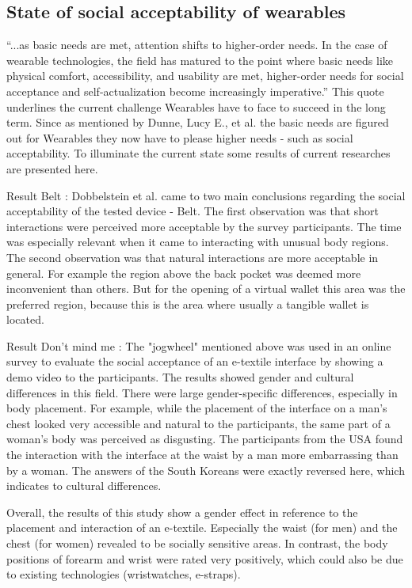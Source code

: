 \documentclass{sigchi}
\begin{document}
\subsection{State of social acceptability of wearables}
“...as basic needs are met, attention shifts to higher-order needs. In the case of wearable technologies, the field has matured to the point where basic needs like physical comfort, accessibility, and usability are met, higher-order needs for social acceptance and self-actualization become increasingly imperative.” \cite[p. 4162]{social-comfort} %
This quote underlines the current challenge Wearables have to face to succeed in the long term. Since as mentioned by Dunne, Lucy E., et al. the basic needs are figured out for Wearables they now have to please higher needs - such as social acceptability. To illuminate the current state some results of current researches are presented here.



Result Belt \cite{belt} : Dobbelstein et al. came to two main conclusions regarding the social acceptability of the tested device - Belt. The first observation was that short interactions were perceived more acceptable by the survey participants. The time was especially relevant when it came to interacting with unusual body regions. The second observation was that natural interactions are more acceptable in general. For example the region above the back pocket was deemed more inconvenient than others. But for the opening of a virtual wallet this area was the preferred region, because this is the area where usually a tangible wallet is located.

Result Don’t mind me \cite{touch-wrist}: The "jogwheel" mentioned above was used in an online survey to evaluate the social acceptance of an e-textile interface by showing a demo video to the participants. The results showed gender and cultural differences in this field. There were large gender-specific differences, especially in body placement. For example, while the placement of the interface on a man's chest looked very accessible and natural to the participants, the same part of a woman's body was perceived as disgusting. The participants from the USA found the interaction with the interface at the waist by a man more embarrassing than by a woman. The answers of the South Koreans were exactly reversed here, which indicates to cultural differences. \cite{touch-wrist}

Overall, the results of this study show a gender effect in reference to the placement and interaction of an e-textile. Especially the waist (for men) and the chest (for women) revealed to be socially sensitive areas. In contrast, the body positions of forearm and wrist were rated very positively, which could also be due to existing technologies (wristwatches, e-straps).
\end{document}
